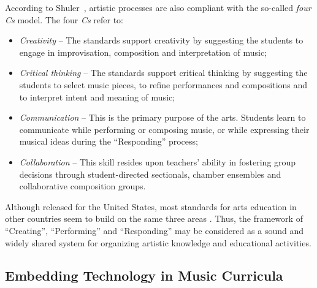 \documentclass[journal]{IEEEtran}
\begin{document}
According to Shuler~\cite{shuler2011music}, artistic processes are also compliant with the so-called \textit{four Cs} model. The four \textit{Cs} refer to:
\begin{itemize}
	\item \textit{Creativity} -- The standards support creativity by suggesting the students to engage in improvisation, composition and interpretation of music;
	\item \textit{Critical thinking} -- The standards support critical thinking by suggesting the students to select music pieces, to refine performances and compositions and to interpret intent and meaning of music;
	\item \textit{Communication} -- This is the primary purpose of the arts. Students learn to communicate while performing or composing music, or while expressing their musical ideas during the ``Responding'' process;
	\item \textit{Collaboration} -- This skill resides upon teachers' ability in fostering group decisions through student-directed sectionals, chamber ensembles and collaborative composition groups.
	
\end{itemize}

Although released for the United States, most standards for arts education in other countries seem to build on the same three areas \cite{AC, AEKLA, NCE, PSC}. Thus, the framework of ``Creating'', ``Performing'' and ``Responding'' may be considered as a sound and widely shared system for organizing artistic knowledge and educational activities.

\subsection{Embedding Technology in Music Curricula}
\label{subsubsec:MTC}
\end{document}

